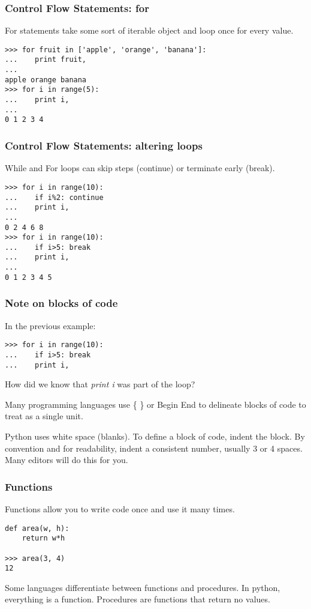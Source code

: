 \documentclass[10pt]{beamer}
\begin{document}
\begin{frame}[fragile]
\frametitle{Control Flow Statements: for}

For statements take some sort of iterable object and loop once for 
every value.

\begin{verbatim}
>>> for fruit in ['apple', 'orange', 'banana']:
...    print fruit, 
... 
apple orange banana
>>> for i in range(5):
...    print i,
... 
0 1 2 3 4 

\end{verbatim}

\end{frame}

\begin{frame}[fragile]
\frametitle{Control Flow Statements: altering loops}

While and For loops can skip steps (continue) or terminate early (break).

\begin{verbatim}
>>> for i in range(10):
...    if i%2: continue
...    print i, 
... 
0 2 4 6 8
>>> for i in range(10):
...    if i>5: break
...    print i,
... 
0 1 2 3 4 5
\end{verbatim}

\end{frame}

\begin{frame}[fragile]
\frametitle{Note on blocks of code}

In the previous example:
\begin{verbatim}
>>> for i in range(10):
...    if i>5: break
...    print i,
\end{verbatim}

How did we know that \textit{print i} was part of the loop?

Many programming languages use \{ \} or Begin End to delineate blocks of
code to treat as a single unit.

Python uses white space (blanks).  To define a block of code, indent the block.
By convention and for readability, indent a consistent number, 
usually 3 or 4 spaces.  Many editors will do this for you.

\end{frame}

\begin{frame}[fragile]
\frametitle{Functions}

Functions allow you to write code once and use it many times.

\begin{verbatim}
def area(w, h):
    return w*h

>>> area(3, 4)
12
\end{verbatim}

Some languages differentiate between functions and procedures.  In python, everything is a function.
Procedures are functions that return no values.

\end{frame}
\end{document}
